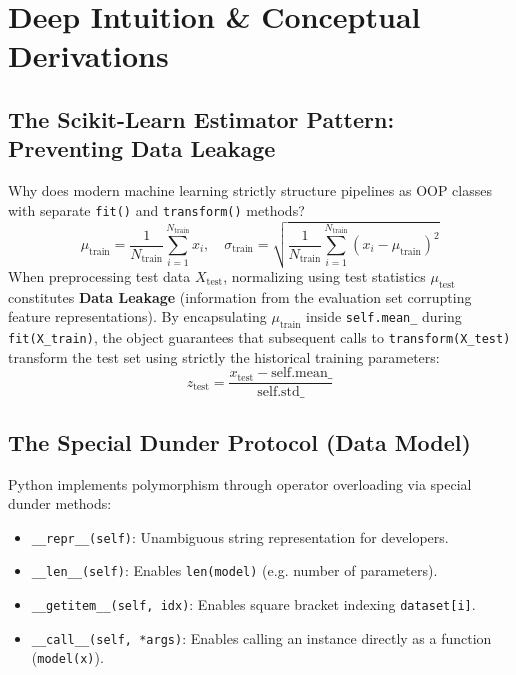 \section{Deep Intuition \& Conceptual Derivations}

\subsection{The Scikit-Learn Estimator Pattern: Preventing Data Leakage}
Why does modern machine learning strictly structure pipelines as OOP classes with separate \texttt{fit()} and \texttt{transform()} methods?
\begin{equation}
\mu_{\text{train}} = \frac{1}{N_{\text{train}}} \sum_{i=1}^{N_{\text{train}}} x_i, \quad \sigma_{\text{train}} = \sqrt{\frac{1}{N_{\text{train}}} \sum_{i=1}^{N_{\text{train}}} (x_i - \mu_{\text{train}})^2}
\end{equation}
When preprocessing test data $X_{\text{test}}$, normalizing using test statistics $\mu_{\text{test}}$ constitutes \textbf{Data Leakage} (information from the evaluation set corrupting feature representations). By encapsulating $\mu_{\text{train}}$ inside \texttt{self.mean\_} during \texttt{fit(X\_train)}, the object guarantees that subsequent calls to \texttt{transform(X\_test)} transform the test set using strictly the historical training parameters:
\begin{equation}
z_{\text{test}} = \frac{x_{\text{test}} - \text{self.mean\_}}{\text{self.std\_}}
\end{equation}

\subsection{The Special Dunder Protocol (Data Model)}
Python implements polymorphism through operator overloading via special dunder methods:
\begin{itemize}
    \item \texttt{\_\_repr\_\_(self)}: Unambiguous string representation for developers.
    \item \texttt{\_\_len\_\_(self)}: Enables \texttt{len(model)} (e.g. number of parameters).
    \item \texttt{\_\_getitem\_\_(self, idx)}: Enables square bracket indexing \texttt{dataset[i]}.
    \item \texttt{\_\_call\_\_(self, *args)}: Enables calling an instance directly as a function (\texttt{model(x)}).
\end{itemize}


